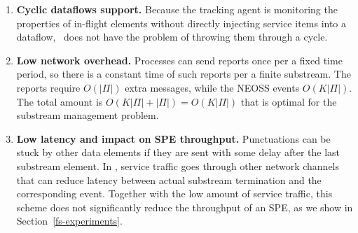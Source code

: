 \begin{enumerate}
    \item {\bf Cyclic dataflows support.} Because the tracking agent is monitoring the properties of in-flight elements without directly injecting service items into a dataflow, \tracker\ does not have the problem of throwing them through a cycle.
    \item {\bf Low network overhead.} Processes can send reports once per a fixed time period, so there is a constant time of such reports per a finite substream. The reports require $O(|\Pi|)$ extra messages, while the NEOSS events $O(K|\Pi|)$. The total amount is $O(K|\Pi| + |\Pi|) = O(K|\Pi|)$ that is optimal for the substream management problem. 
    \item {\bf Low latency and impact on SPE throughput.} Punctuations can be stuck by other data elements if they are sent with some delay after the last substream element. In \tracker, service traffic goes through other network channels that can reduce latency between actual substream termination and the corresponding event. Together with the low amount of service traffic, this scheme does not significantly reduce the throughput of an SPE, as we show in Section~\ref{fs-experiments}.
\end{enumerate}

